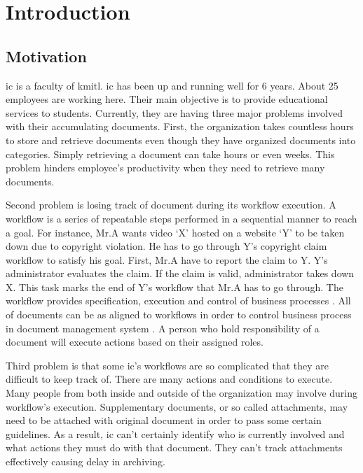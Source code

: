 \chapter{Introduction}

\section{Motivation}
\gls{ic} is a faculty of \gls{kmitl}. 
\gls{ic} has been up and running well for 6 years.
About 25 employees are working here.
Their main objective is to provide educational services to students. 
Currently, they are having three major problems involved with their accumulating documents.
First, the organization takes countless hours to store and retrieve documents even though they have organized documents into categories.
Simply retrieving a document can take hours or even weeks. 
This problem hinders employee's productivity when they need to retrieve many documents. 

Second problem is losing track of document during its workflow execution. 
A workflow is a series of repeatable steps performed in a sequential manner to reach a goal.
For instance, Mr.A wants video \enquote*{X} hosted on a website \enquote*{Y} to be taken down due to copyright violation.
He has to go through Y's copyright claim workflow to satisfy his goal.
First, Mr.A have to report the claim to Y.
Y's administrator evaluates the claim.
If the claim is valid, administrator takes down X.
This task marks the end of Y's workflow that Mr.A has to go through.
The workflow provides specification, execution and control of business processes \cite{Jablonski:1996:WMM}. 
All of documents can be as aligned to workflows in order to control business process in document management system \cite{DBLP:journals/corr/AsiliT14}.
A person who hold responsibility of a document will execute actions based on their assigned roles.

Third problem is that some \gls{ic}'s workflows are so complicated that they are difficult to keep track of.
There are many actions and conditions to execute.
Many people from both inside and outside of the organization may involve during workflow's execution.
Supplementary documents, or so called attachments, may need to be attached with original document in order to pass some certain guidelines.
As a result, \gls{ic} can't certainly identify who is currently involved and what actions they must do with that document.
They can't track attachments effectively causing delay in archiving.

